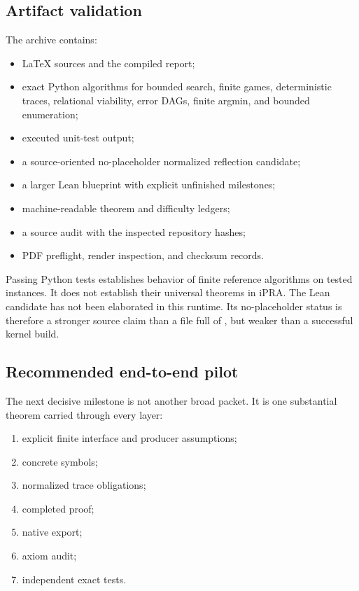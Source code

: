 \subsection{Artifact validation}

The archive contains:
\begin{itemize}
\item LaTeX sources and the compiled report;
\item exact Python algorithms for bounded search, finite games, deterministic traces, relational viability, error DAGs, finite argmin, and bounded enumeration;
\item executed unit-test output;
\item a source-oriented no-placeholder normalized reflection candidate;
\item a larger Lean blueprint with explicit unfinished milestones;
\item machine-readable theorem and difficulty ledgers;
\item a source audit with the inspected repository hashes;
\item PDF preflight, render inspection, and checksum records.
\end{itemize}

Passing Python tests establishes behavior of finite reference algorithms on tested instances.  It does not establish their universal theorems in iPRA.  The Lean candidate has not been elaborated in this runtime.  Its no-placeholder status is therefore a stronger source claim than a file full of , but weaker than a successful kernel build.

\subsection{Recommended end-to-end pilot}

The next decisive milestone is not another broad packet.  It is one substantial theorem carried through every layer:
\begin{enumerate}
\item explicit finite interface and producer assumptions;
\item concrete  symbols;
\item normalized trace obligations;
\item completed  proof;
\item native export;
\item axiom audit;
\item independent exact tests.
\end{enumerate}

